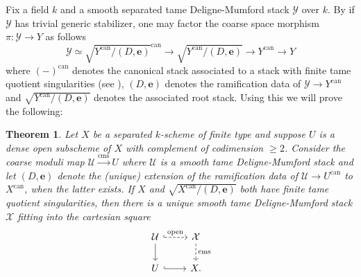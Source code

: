 \documentclass{amsart}
\newcommand{\cU}{\mathcal{U}}
\newcommand{\cX}{\mathcal{X}}
\newcommand{\cY}{\mathcal{Y}}
\newtheorem{Teo}[theorem]{Theorem}
\theoremstyle{definition}
\begin{document}
Fix a field $k$ and a smooth separated tame Deligne-Mumford stack $\mathcal{Y}$ over $k$. By \cite[Thm. 1]{GS17} if $\cY$ has trivial generic stabilizer, one may factor the coarse space morphism $\pi\colon \mathcal{Y} \to Y$ as follows
\[\mathcal{Y} \simeq \sqrt{Y^{\mathrm{can}}/(D,\mathbf{e})}^{\mathrm{can}} \to \sqrt{Y^{\mathrm{can}}/(D,\mathbf{e})} \to Y^{\mathrm{can}} \to Y \]
where $(-)^{\mathrm{can}}$ denotes the canonical stack associated to a stack with finite tame quotient singularities (see \cite[Sec. 2]{GS17}), $(D,\mathbf{e})$ denotes the ramification data of $\cY \to Y^{\mathrm{can}}$ and $\sqrt{Y^{\mathrm{can}}/(D,\mathbf{e})}$ denotes the associated root stack. Using this we will prove the following:

    


  \begin{Teo}\label{thm_DM_stack_is_determined_by_cms_and_codim1}
     Let $X$ be a separated $k$-scheme of finite type and suppose $U$ is a dense open subscheme of $X$ with complement of codimension $\geq 2$. Consider the coarse moduli map $\cU \xrightarrow{\mathrm{cms}} U$ where $\cU$ is a smooth tame Deligne-Mumford stack and let $(D,\mathbf{e})$ denote the (unique) extension of the ramification data of $\cU \to U^{\mathrm{can}}$ to $X^{\mathrm{can}}$, when the latter exists. If $X$ and $\sqrt{X^{\mathrm{can}}/(D,\mathbf{e})}$ both have finite tame quotient singularities, then there is a unique smooth tame Deligne-Mumford stack $\cX$ fitting into the cartesian square
      $$ 
    \begin{tikzcd}
    \cU \arrow[d] \arrow[r, dashed, hook, "\mathrm{open}"] & \cX \arrow[d, dashed, "\mathrm{cms}"] \\
    U \arrow[r, hook]   & X.                  
    \end{tikzcd}
    $$
 \end{Teo} 
\end{document}

